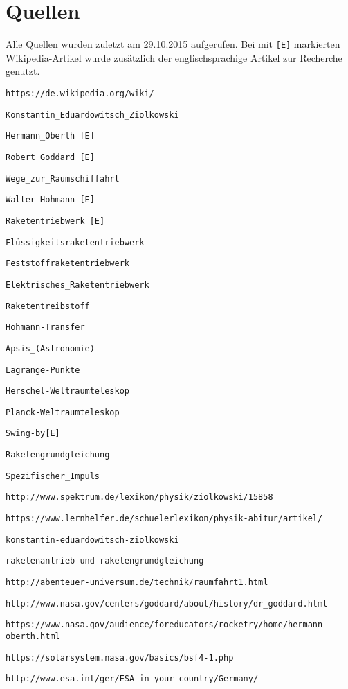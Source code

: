 \documentclass[12pt,a4paper]{article}
\begin{document}
\section{Quellen}
Alle Quellen wurden zuletzt am 29.10.2015 aufgerufen. Bei mit \verb![E]! markierten Wikipedia-Artikel wurde zusätzlich der englischsprachige Artikel zur Recherche genutzt. 
\begin{compactitem}
\item \verb!https://de.wikipedia.org/wiki/!  
\begin{compactitem}
\item \verb!Konstantin_Eduardowitsch_Ziolkowski!
\item \verb!Hermann_Oberth [E]!
\item \verb!Robert_Goddard [E]!
\item \verb!Wege_zur_Raumschiffahrt!
\item \verb!Walter_Hohmann [E]!
\item \verb!Raketentriebwerk [E]!
\item \verb!Flüssigkeitsraketentriebwerk!
\item \verb!Feststoffraketentriebwerk!
\item \verb!Elektrisches_Raketentriebwerk!
\item \verb!Raketentreibstoff!
\item \verb!Hohmann-Transfer!
\item \verb!Apsis_(Astronomie)!
\item \verb!Lagrange-Punkte!
\item \verb!Herschel-Weltraumteleskop!
\item \verb!Planck-Weltraumteleskop!
\item \verb!Swing-by[E]!
\item \verb!Raketengrundgleichung!
\item \verb!Spezifischer_Impuls!
\end{compactitem}
\item \verb!http://www.spektrum.de/lexikon/physik/ziolkowski/15858!
\item \verb!https://www.lernhelfer.de/schuelerlexikon/physik-abitur/artikel/!
\begin{compactitem}
\item \verb!konstantin-eduardowitsch-ziolkowski!
\item \verb!raketenantrieb-und-raketengrundgleichung!
\end{compactitem}
\item \verb!http://abenteuer-universum.de/technik/raumfahrt1.html!
\item \verb!http://www.nasa.gov/centers/goddard/about/history/dr_goddard.html!
\item \verb!https://www.nasa.gov/audience/foreducators/rocketry/home/hermann-oberth.html!
\item \verb!https://solarsystem.nasa.gov/basics/bsf4-1.php!
\item \verb!http://www.esa.int/ger/ESA_in_your_country/Germany/!


\end{compactitem}
\end{document}
